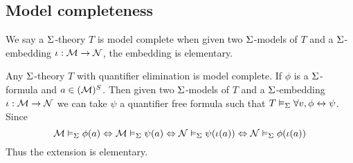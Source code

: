 \subsection{Model completeness}%
\begin{dfn}
    We say a $\Sigma$-theory $T$ is model complete when given two $\Sigma$-models
    of $T$ and a $\Sigma$-embedding $\iota : \mathcal{M} \to \mathcal{N}$,
    the embedding is elementary.
\end{dfn}
\begin{rmk}
    Any $\Sigma$-theory $T$ with quantifier elimination is model complete.
    If $\phi$ is a $\Sigma$-formula and $a \in ({\mathcal{M}})^S$.
    Then given two $\Sigma$-models
    of $T$ and a $\Sigma$-embedding $\iota : \mathcal{M} \to \mathcal{N}$ we can take
    $\psi$ a quantifier free formula such that 
    $T \vDash_{\Sigma} \forall v, \phi \leftrightarrow \psi$.
    Since 
    \[
        \mathcal{M} \vDash_{\Sigma} \phi(a) \Leftrightarrow \mathcal{M} \vDash_{\Sigma} \psi(a)
        \Leftrightarrow \mathcal{N} \vDash_{\Sigma} \psi(\iota (a)) \Leftrightarrow \mathcal{N} \vDash_{\Sigma} \phi(\iota(a))
    \]
    Thus the extension is elementary.
\end{rmk}
